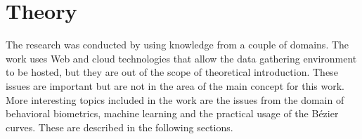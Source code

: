 \chapter{Theory}\label{ch:theory}
The research was conducted by using knowledge from a couple of domains.
The work uses Web and cloud technologies that allow the data gathering environment to be hosted, but they are out of the scope of theoretical introduction.
These issues are important but are not in the area of the main concept for this work.
More interesting topics included in the work are the issues from the domain of behavioral biometrics, machine learning and the practical usage of the Bézier curves.
These are described in the following sections.
